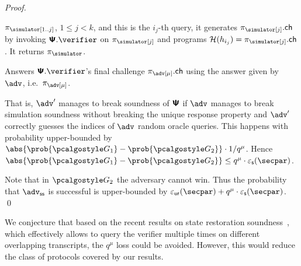 \documentclass[runningheads,11pt]{llncs}
\begin{document}
\begin{proof}
\begin{compactitem}
    $\zkproof_\simulator[1..j]$, $1 \leq j < k$, and this is the $i_j$-th query,
    it generates $\zkproof_\simulator[j].\ch$ by invoking $\ps.\verifier$ on
    $\zkproof_\simulator[j]$ and programs
    $\ro(h_{i_j}) = \zkproof_\simulator[j].\ch$.  It returns
    $\zkproof_\simulator$.
  \item Answers $\ps.\verifier$'s final challenge $\zkproof_\adv[\mu].\ch$ using the
    answer given by $\adv$, i.e.~$\zkproof_\adv[\mu]$.
  \end{compactitem}
  That is, $\adv'$ manages to break soundness of $\bm{\mathsf{\Psi}}$ if $\adv$ manages to
  break simulation soundness without breaking the unique response property and
  $\adv'$ correctly guesses the indices of $\adv$ random oracle queries. This
  happens with probability upper-bounded by $\abs{\prob{\game{1}} -
    \prob{\game{2}}} \cdot \infrac{1}{q^{\mu}}$. Hence $\abs{\prob{\game{1}} -
    \prob{\game{2}}} \leq q^{\mu} \cdot \epss(\secpar)$.

  Note that in $\game{2}$ the adversary cannot win. Thus the probability
  that $\advss$ is successful is upper-bounded by
  $\epsur(\secpar) + q^{\mu} \cdot \epss(\secpar)$.  \qed
\end{proof}


We conjecture that based on the recent results on state restoration soundness~\cite{cryptoeprint:2020:1351}, which effectively allows to query the verifier multiple times on different overlapping transcripts, the $q^{\mu}$ loss could be avoided. However, this would reduce the class of protocols covered by our results. 
\end{document}
